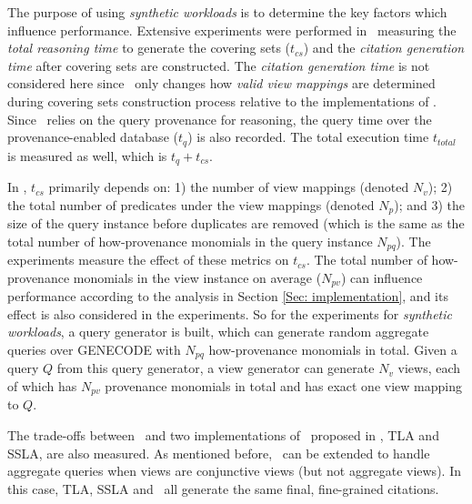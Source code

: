 The purpose of using {\em synthetic workloads} is to determine the key factors which influence performance. 
Extensive experiments were performed in~\cite{wu2018data} measuring the \textit{total reasoning time}  to generate the covering sets ($t_{cs}$) and the \textit{citation generation time}   after covering sets are constructed.  The \textit{citation generation time} is not considered here since \provalg\ only changes how {\em valid view mappings} are determined during covering sets construction process %
relative to the implementations of \rba. Since \provalg\ relies on the query provenance for reasoning, the query time over the provenance-enabled database ($t_{q}$) is also recorded. The total execution time $t_{total}$ is measured as well, which is $t_q+t_{cs}$.


In \cite{wu2018data}, $t_{cs}$ primarily depends on: 1) the number of view mappings (denoted $N_v$); 2) the total number of predicates under the view mappings (denoted $N_p$); and 3) the size of the query instance before duplicates are removed (which is the same as the total number of how-provenance monomials in the query instance $N_{pq}$). The experiments measure the effect of these metrics on $t_{cs}$. %
The total number of how-provenance monomials in the view instance on average ($N_{pv}$) can influence performance according to the analysis in Section \ref{Sec: implementation}, and its effect is also considered in the experiments. So for the experiments for {\em synthetic workloads}, a query generator is built, which can generate random aggregate queries over GENECODE with $N_{pq}$ how-provenance monomials in total. Given a query $Q$ from this query generator, a view generator can generate $N_v$ views, each of which has $N_{pv}$ provenance monomials in total and has exact one view mapping to $Q$. 

The trade-offs between \provalg\ and two implementations of  \rba\ proposed in \cite{wu2018data}, TLA and SSLA, are also  measured. 
As mentioned before, \rba\ can be extended to handle aggregate queries when views are conjunctive views (but not aggregate views). In this case, TLA, SSLA and \provalg\ all generate the same final, fine-grained citations.

